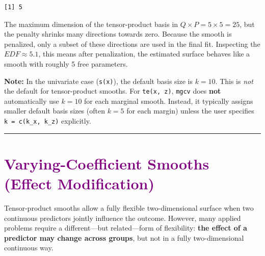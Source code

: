 \documentclass[
  letterpaper,
  DIV=11,
  numbers=noendperiod]{scrreprt}
\newenvironment{Shaded}{\begin{snugshade}}{\end{snugshade}}
\newcommand{\CommentTok}[1]{\textcolor[rgb]{0.37,0.37,0.37}{#1}}
\newcommand{\DecValTok}[1]{\textcolor[rgb]{0.68,0.00,0.00}{#1}}
\newcommand{\NormalTok}[1]{\textcolor[rgb]{0.00,0.23,0.31}{#1}}
\newcommand{\SpecialCharTok}[1]{\textcolor[rgb]{0.37,0.37,0.37}{#1}}
\begin{document}
\begin{Shaded}
\end{Shaded}

\begin{verbatim}
[1] 5
\end{verbatim}

The maximum dimension of the tensor-product basis in
\(Q \times P = 5 \times 5 = 25\), but the penalty shrinks many
directions towards zero. Because the smooth is penalized, only a subset
of these directions are used in the final fit. Inspecting the
\(EDF \approx 5.1\), this means after penalization, the estimated
surface behaves like a smooth with roughly 5 free parameters.

\textbf{Note:} In the univariate case (\texttt{s(x)}), the default basis
size is \(k = 10\). This is \emph{not} the default for tensor-product
smooths. For \texttt{te(x,\ z)}, \texttt{mgcv} does \textbf{not}
automatically use \(k = 10\) for each marginal smooth. Instead, it
typically assigns smaller default basis sizes (often \(k = 5\) for each
margin) unless the user specifies \texttt{k\ =\ c(k\_x,\ k\_z)}
explicitly.

\begin{center}\rule{0.5\linewidth}{0.5pt}\end{center}

\hypertarget{section-35}{%
\section*{\texorpdfstring{\textcolor{purple}{Varying-Coefficient Smooths (Effect Modification)}}{}}\label{section-35}}

\markright{\textcolor{purple}{Varying-Coefficient Smooths (Effect Modification)}}

Tensor-product smooths allow a fully flexible two-dimensional surface
when two continuous predictors jointly influence the outcome. However,
many applied problems require a different---but related---form of
flexibility: \textbf{the effect of a predictor may change across
groups}, but not in a fully two-dimensional continuous way.
\end{document}
